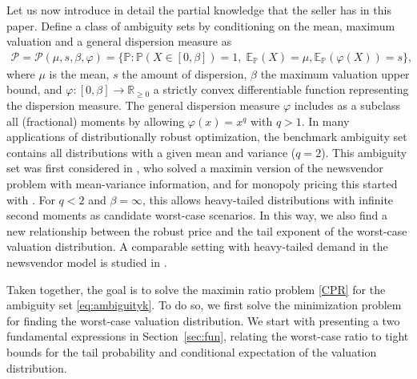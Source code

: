 \documentclass[11pt]{article}
\renewcommand{\P}{\mathbb{P}}
\newcommand{\E}{\mathbb{E}}
\newcommand{\R}{\mathbb{R}}
\newcommand{\Prob}{\mathbb{P}}
\newcommand{\bP}{\mathbb{P}}
\newcommand{\cP}{\mathcal{P}}
\newcommand{\1}{\mathds{1}}
\begin{document}
Let us now introduce in detail the partial knowledge that the seller has in this paper. Define a class of ambiguity sets by conditioning on the mean, maximum valuation and a general dispersion measure as
\begin{align}  
\cP =\cP(\mu,s,\beta,\varphi) =  \{\Prob :  \bP(X \in [0,\beta])=1,\; \E_{\P}(X) = \mu, \E_{\P}(\varphi(X)) = s\},
    \label{eq:ambiguityk}
\end{align}
where $\mu$ is the mean, $s$ the amount of dispersion, $\beta$ the maximum valuation upper bound, and $\varphi : [0,\beta] \rightarrow \R_{\geq 0}$ a strictly convex differentiable function representing the dispersion measure. The general dispersion measure $\varphi$ includes as a subclass all (fractional) moments by allowing $\varphi(x)=x^q$ with $q>1$. In many applications of distributionally robust optimization, the benchmark ambiguity set contains all distributions with a given mean and variance ($q=2$). This ambiguity set was first considered in 
\cite{Scarf1958}, who solved a maximin version of the newsvendor problem with mean-variance information, and for monopoly pricing this started with \cite{azar2012optimal}. For $q< 2$ and $\beta = \infty$, this allows heavy-tailed distributions with infinite second moments as candidate worst-case scenarios. In this way, we also find a new relationship between the robust price and the tail exponent of the worst-case valuation distribution. A comparable setting with heavy-tailed demand in the newsvendor model is studied in \cite{das2021heavy}.

Taken together, the goal is to solve the maximin ratio problem \eqref{CPR} for the ambiguity set \eqref{eq:ambiguityk}. To do so, we first solve the minimization problem for finding the worst-case valuation distribution. We start with presenting a two fundamental expressions in Section~\ref{sec:fun}, relating the worst-case ratio to tight bounds for the tail probability and conditional expectation of the valuation distribution.
\end{document}
